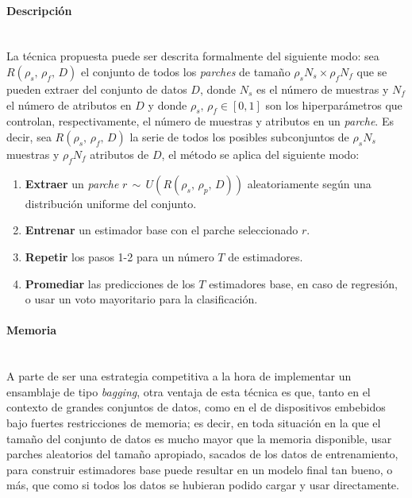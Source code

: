 \documentclass[00-Trabajo_Final.tex]{subfiles}
\begin{document}
\paragraph*{Descripción}\mbox{}\\
La técnica propuesta puede ser descrita formalmente del siguiente modo: sea $R(\rho_s,\,\rho_f,\,D)$ el conjunto de todos los \textit{parches} de tamaño $\rho_s N_s \times \rho_f N_f$ que se pueden extraer del conjunto de datos $D$, donde $N_s$ es el número de muestras y $N_f$ el número de atributos en $D$ y donde $\rho_s,\,\rho_f \in [0,1]$ son los hiperparámetros que controlan, respectivamente, el número de muestras y atributos en un \textit{parche}. Es decir, sea $R(\rho_s,\,\rho_f,\,D)$ la serie de todos los posibles subconjuntos de $\rho_s N_s$ muestras y $\rho_f N_f$ atributos de $D$, el método se aplica del siguiente modo:

\begin{enumerate}[noitemsep]
    \item \textbf{Extraer} un \textit{parche} $r \, \sim \, U(R(\rho_s,\,\rho_p,\,D))$ aleatoriamente según una distribución uniforme del conjunto.
    \item \textbf{Entrenar} un estimador base con el parche seleccionado $r$.
    \item \textbf{Repetir} los pasos 1-2 para un número $T$ de estimadores.
    \item \textbf{Promediar} las predicciones de los $T$ estimadores base, en caso de regresión, o usar un voto mayoritario para la clasificación.
\end{enumerate}

\paragraph*{Memoria}\mbox{}\\
A parte de ser una estrategia competitiva a la hora de implementar un ensamblaje de tipo \textit{bagging}, otra ventaja de esta técnica es que, tanto en el contexto de grandes conjuntos de datos, como en el de dispositivos embebidos bajo fuertes restricciones de memoria; es decir, en toda situación en la que el tamaño del conjunto de datos es mucho mayor que la memoria disponible, usar parches aleatorios del tamaño apropiado, sacados de los datos de entrenamiento, para construir estimadores base puede resultar en un modelo final tan bueno, o más, que como si todos los datos se hubieran podido cargar y usar directamente.
\end{document}
